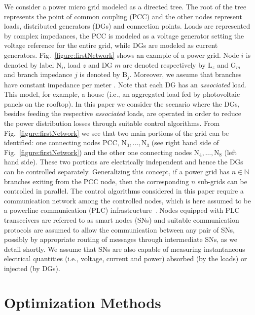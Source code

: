 \documentclass[journal]{IEEEtran}
\newcommand{\fig}[1]{Fig.~\ref{#1}}
\begin{document}
We consider a power micro grid modeled as a directed tree. The root of the tree represents the point of common coupling (PCC) and the other nodes represent loads, distributed generators (DGs) and connection points. Loads are represented by complex impedances, the PCC is modeled as a voltage generator setting the voltage reference for the entire grid, while DGs are modeled as current generators.  \fig{figure:firstNetwork} shows an example of a power grid. Node $i$ is denoted by label $\text{N}_i$, load $z$ and DG $m$ are denoted respectively by $\text{L}_z$ and $\text{G}_m$  and branch impedance $j$ is denoted by $\text{B}_j$. Moreover, we assume that branches have constant impedance per meter \cite{SurroundControl, DORPF}. Note that each DG has an \textit{associated} load. This model, for example, a house (i.e., an aggregated load fed by photovoltaic panels on the rooftop). In this paper we consider the scenario where the DGs, besides feeding the respective \textit{associated} loads,  are operated in order to reduce the power distribution losses through suitable control algorithms. From \fig{figure:firstNetwork} we see that two main portions of the grid can be identified: one connecting nodes {PCC, $\text{N}_0, \dots, \text{N}_3$} (see right hand side of \fig{figure:firstNetwork}) and the other one connecting  nodes {$\text{N}_4, \dots, \text{N}_8$} (left hand side). These two portions are electrically independent and hence the DGs can be controlled separately. Generalizing this concept, if a power grid has $n\in\mathbb{N}$ branches exiting from the PCC node, then the corresponding $n$ sub-grids can be controlled in parallel. The control algorithms considered in this paper require a communication network among the controlled nodes, which is here assumed to be a powerline communication (PLC) infrastructure~\cite{Rossi-BC-2013}. Nodes equipped with PLC transceivers are referred to as smart nodes (SNs) and suitable communication protocols are assumed to allow the communication between any pair of SNs, possibly by appropriate routing of messages through intermediate SNs, as we detail shortly. We assume that SNs are also capable of measuring instantaneous electrical quantities (i.e., voltage, current and power) absorbed (by the loads) or injected (by DGs). 



\section{Optimization Methods}
\label{sec:optmethods}
\end{document}
